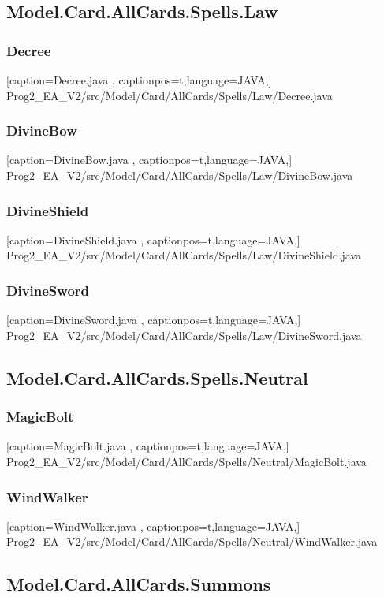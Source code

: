 \documentclass[a4paper,12pt]{scrartcl}
\begin{document}
	\subsection{Model.Card.AllCards.Spells.Law}
	\subsubsection{Decree}
	
	[caption={Decree.java}
	\label{lst:javaclass},
	captionpos=t,language=JAVA,]
	{Prog2_EA_V2/src/Model/Card/AllCards/Spells/Law/Decree.java}
	\subsubsection{DivineBow}
	
	[caption={DivineBow.java}
	\label{lst:javaclass},
	captionpos=t,language=JAVA,]
	{Prog2_EA_V2/src/Model/Card/AllCards/Spells/Law/DivineBow.java}
	\subsubsection{DivineShield}
	
	[caption={DivineShield.java}
	\label{lst:javaclass},
	captionpos=t,language=JAVA,]
	{Prog2_EA_V2/src/Model/Card/AllCards/Spells/Law/DivineShield.java}
	\subsubsection{DivineSword}
	
	[caption={DivineSword.java}
	\label{lst:javaclass},
	captionpos=t,language=JAVA,]
	{Prog2_EA_V2/src/Model/Card/AllCards/Spells/Law/DivineSword.java}
	\subsection{Model.Card.AllCards.Spells.Neutral}
	\subsubsection{MagicBolt}
	
	[caption={MagicBolt.java}
	\label{lst:javaclass},
	captionpos=t,language=JAVA,]
	{Prog2_EA_V2/src/Model/Card/AllCards/Spells/Neutral/MagicBolt.java}
	\subsubsection{WindWalker}
	
	[caption={WindWalker.java}
	\label{lst:javaclass},
	captionpos=t,language=JAVA,]
	{Prog2_EA_V2/src/Model/Card/AllCards/Spells/Neutral/WindWalker.java}
	\subsection{Model.Card.AllCards.Summons}
\end{document}
